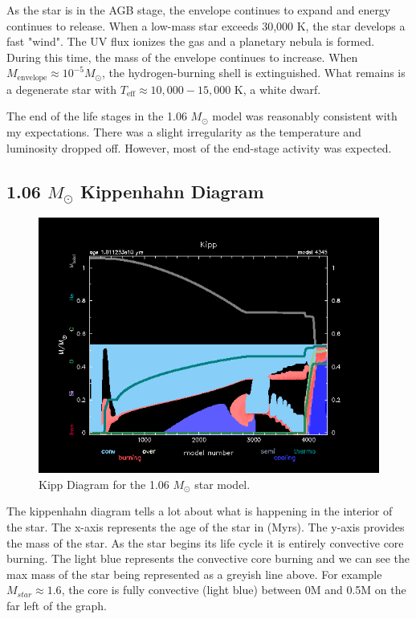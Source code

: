 \documentclass[fleqn,usenatbib]{mnras}
\begin{document}
As the star is in the AGB stage, the envelope continues to expand and energy continues to release. When a low-mass star exceeds 30,000 K, the star develops a fast "wind". The UV flux ionizes the gas and a planetary nebula is formed. During this time, the mass of the envelope continues to increase. When $M_{\text{envelope}} \approx 10^{-5} M_\odot$, the hydrogen-burning shell is extinguished. What remains is a degenerate star with $T_{\text{eff}} \approx 10,000 - 15,000$ K, a white dwarf.

The end of the life stages in the 1.06 \(M_\odot\) model was reasonably consistent with my expectations. There was a slight irregularity as the temperature and luminosity dropped off. However, most of the end-stage activity was expected.

\subsection{1.06 \(M_\odot\) Kippenhahn Diagram}

\begin{figure}
    \centering
    \includegraphics[width=\columnwidth]{1.06_kipp_profile.png}
    \caption{Kipp Diagram for the 1.06 $M_\odot$ star model.}
    \label{fig:1.06_Msol_kipp_figure}
\end{figure}


\par The kippenhahn diagram tells a lot about what is happening in the interior of the star. The x-axis represents the age of the star in (Myrs).  The y-axis provides the mass of the star. As the star begins its life cycle it is entirely convective core burning.  The light blue represents the convective core burning and we can see the max mass of the star being represented as a greyish line above.  For example $ M_{star} \approx 1.6 $, the core is fully convective (light blue) between 0M and 0.5M on the far left of the graph. 
\end{document}
